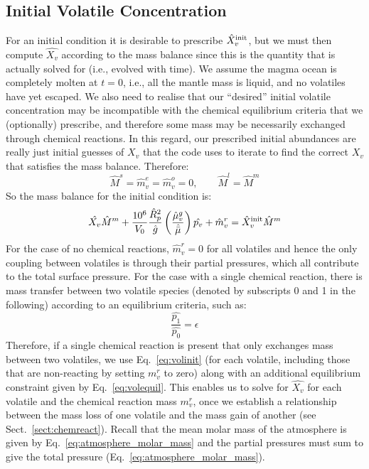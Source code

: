 \subsection{Initial Volatile Concentration}
For an initial condition it is desirable to prescribe $\hat{X}_v^{\rm init}$, but we must then compute $\hat{X_v}$ according to the mass balance since this is the quantity that is actually solved for (i.e., evolved with time).  We assume the magma ocean is completely molten at $t=0$, i.e., all the mantle mass is liquid, and no volatiles have yet escaped.  We also need to realise that our ``desired'' initial volatile concentration may be incompatible with the chemical equilibrium criteria that we (optionally) prescribe, and therefore some mass may be necessarily exchanged through chemical reactions.  In this regard, our prescribed initial abundances are really just initial guesses of $X_v$ that the code uses to iterate to find the correct $X_v$ that satisfies the mass balance.  Therefore:
\begin{equation}
\hat{M}^s = \hat{m}_v^e = \hat{m}_v^o = 0, \qquad \hat{M}^l = \hat{M}^m
\end{equation}
So the mass balance for the initial condition is:
\begin{equation}
\hat{X_v} \hat{M}^m + \frac{10^6}{V_0} \frac{\hat{R}_p^2}{\hat{g}} \left( \frac{\hat{\mu}_v^g}{\hat{\bar{\mu}}} \right)\hat{p_v} + \hat{m}_v^r = \hat{X}_v^{\rm init} \hat{M}^m
\label{eq:volinit}
\end{equation}
For the case of no chemical reactions, $\hat{m}_v^r=0$ for all volatiles and hence the only coupling between volatiles is through their partial pressures, which all contribute to the total surface pressure.  For the case with a single chemical reaction, there is mass transfer between two volatile species (denoted by subscripts 0 and 1 in the following) according to an equilibrium criteria, such as:
\begin{equation}
\frac{\hat{p_1}}{\hat{p_0}} = \epsilon
\label{eq:volequil}
\end{equation}
Therefore, if a single chemical reaction is present that only exchanges mass between two volatiles, we use Eq.~\ref{eq:volinit} (for each volatile, including those that are non-reacting by setting $m_v^r$ to zero) along with an additional equilibrium constraint given by Eq.~\ref{eq:volequil}.  This enables us to solve for $\hat{X_v}$ for each volatile and the chemical reaction mass $m_v^r$, once we establish a relationship between the mass loss of one volatile and the mass gain of another (see Sect.~\ref{sect:chemreact}).  Recall that the mean molar mass of the atmosphere is given by Eq.~\ref{eq:atmosphere_molar_mass} and the partial pressures must sum to give the total pressure (Eq.~\ref{eq:atmosphere_molar_mass}).

